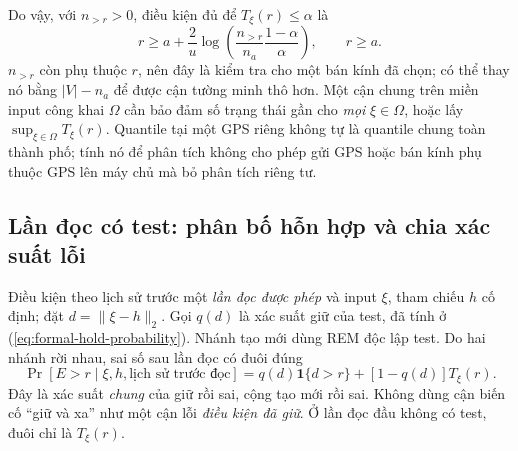 Do vậy, với $n_{>r}>0$, điều kiện đủ để $T_\xi(r)\leq\alpha$ là
\begin{equation}
 r\geq a+\frac2u\log\!\left(\frac{n_{>r}}{n_a}
                                  \frac{1-\alpha}{\alpha}\right),
 \qquad r\geq a.
 \label{eq:accuracy-rem-radius-sufficient}
\end{equation}
$n_{>r}$ còn phụ thuộc $r$, nên đây là kiểm tra cho một bán kính đã chọn;
có thể thay nó bằng $|V|-n_a$ để được cận tường minh thô hơn. Một cận chung
trên miền input công khai $\Omega$ cần bảo đảm số trạng thái gần cho
\emph{mọi} $\xi\in\Omega$, hoặc lấy $\sup_{\xi\in\Omega}T_\xi(r)$.
Quantile tại một GPS riêng không tự là quantile chung toàn thành phố;
tính nó để phân tích không cho phép gửi GPS hoặc bán kính phụ thuộc GPS
lên máy chủ mà bỏ phân tích riêng tư.

\subsection{Lần đọc có test: phân bố hỗn hợp và chia xác suất lỗi}
\label{sec:formal-reuse-accuracy}

Điều kiện theo lịch sử trước một \emph{lần đọc được phép} và input $\xi$,
tham chiếu $h$ cố định; đặt $d=\|\xi-h\|_2$. Gọi $q(d)$ là xác suất giữ
của test, đã tính ở (\ref{eq:formal-hold-probability}). Nhánh tạo mới dùng
REM độc lập test. Do hai nhánh rời nhau, sai số sau lần đọc có đuôi đúng
\begin{equation}
 \Pr[E>r\mid\xi,h,\text{lịch sử trước đọc}]
 =q(d)\mathbf1\{d>r\}+[1-q(d)]T_\xi(r).
 \label{eq:accuracy-reuse-mixture}
\end{equation}
Đây là xác suất \emph{chung} của giữ rồi sai, cộng tạo mới rồi sai.
Không dùng cận biến cố ``giữ và xa'' như một cận lỗi \emph{điều kiện đã giữ}.
Ở lần đọc đầu không có test, đuôi chỉ là $T_\xi(r)$.

